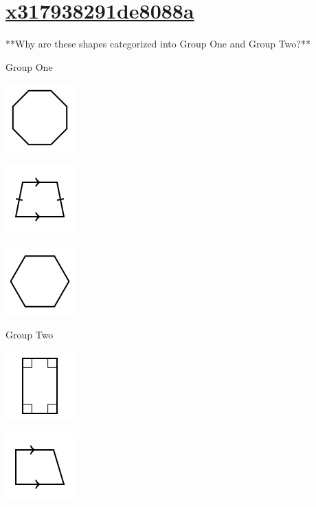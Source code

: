 \documentclass[twocolumn,10pt]{article}
\def\shrinkfactor{0.55}
\begin{document}
\section{\href{https://www.khanacademy.org/devadmin/content/items/x317938291de8088a}{x317938291de8088a}}

\noindent
**Why are these shapes categorized into Group One and Group Two?**
 
Group One


\includegraphics[scale=\shrinkfactor]{figures/7d98a99c75a84da8f748444ad7a3a8053be16a27.png}

\includegraphics[scale=\shrinkfactor]{figures/f6970c7834b69ce137488d985cb48d2f38c66936.png}

\includegraphics[scale=\shrinkfactor]{figures/0245164f3f4897772e76d361f955075a80732b03.png}

Group Two


\includegraphics[scale=\shrinkfactor]{figures/de8e97f23717ff840eeffe53dee6e1dc88c119fa.png}

\includegraphics[scale=\shrinkfactor]{figures/53c957e1607d463070480943456fd8435ab45b5d.png}
\end{document}
